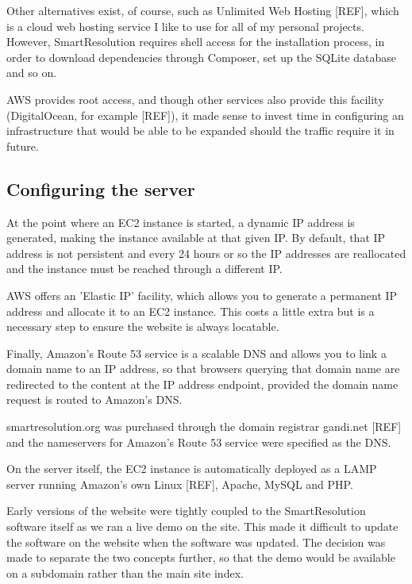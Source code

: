 Other alternatives exist, of course, such as Unlimited Web Hosting [REF], which is a cloud web hosting service I like to use for all of my personal projects. However, SmartResolution requires shell access for the installation process, in order to download dependencies through Composer, set up the SQLite database and so on.

AWS provides root access, and though other services also provide this facility (DigitalOcean, for example [REF]), it made sense to invest time in configuring an infrastructure that would be able to be expanded should the traffic require it in future.

\subsection{Configuring the server}

At the point where an EC2 instance is started, a dynamic IP address is generated, making the instance available at that given IP. By default, that IP address is not persistent and every 24 hours or so the IP addresses are reallocated and the instance must be reached through a different IP.

AWS offers an 'Elastic IP' facility, which allows you to generate a permanent IP address and allocate it to an EC2 instance. This costs a little extra but is a necessary step to ensure the website is always locatable.

Finally, Amazon's Route 53 service is a scalable DNS and allows you to link a domain name to an IP address, so that browsers querying that domain name are redirected to the content at the IP address endpoint, provided the domain name request is routed to Amazon's DNS.

smartresolution.org was purchased through the domain registrar gandi.net [REF] and the nameservers for Amazon's Route 53 service were specified as the DNS.

On the server itself, the EC2 instance is automatically deployed as a LAMP server running Amazon's own Linux [REF], Apache, MySQL and PHP.

Early versions of the website were tightly coupled to the SmartResolution software itself as we ran a live demo on the site. This made it difficult to update the software on the website when the software was updated. The decision was made to separate the two concepts further, so that the demo would be available on a subdomain rather than the main site index.

